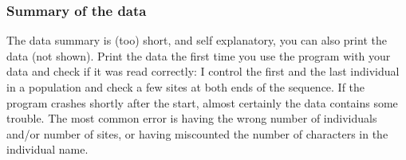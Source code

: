\subsubsection{Summary of the data}
\begin{center}
\begin{boxedminipage}{6in}
\begin{small}
\end{small}
\end{boxedminipage}
\end{center}
The data summary is (too) short, and self explanatory, you can also print
the data (not shown). Print the data the first time you use the program with
your data and check if it was read correctly: I control the first and the last
individual in a population and check a few sites at both ends of the sequence.
If the program crashes shortly after the start, almost certainly the data
contains some trouble. The most common error is having the wrong number
of individuals and/or number of sites, or having miscounted the number of characters in the individual name.
\newpage
